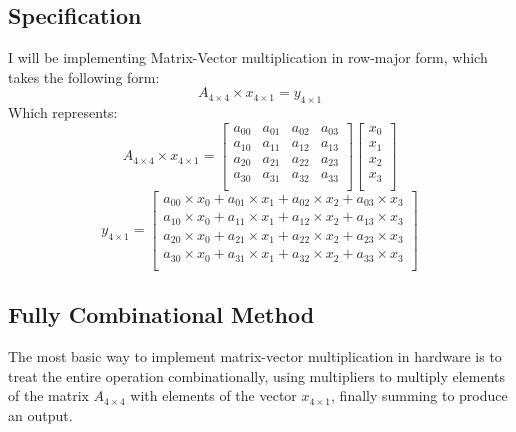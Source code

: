 \documentclass{article}
\begin{document}
\subsection{Specification}
I will be implementing Matrix-Vector multiplication in row-major form, which takes the following form:
\begin{equation}
    A_{4\times4} \times{} x_{4\times1} = y_{4\times1}
\end{equation}
Which represents:
\begin{equation}
A_{4\times4} \times{} x_{4\times1} =
    \left[ {\begin{array}{cccc}
    a_{00} & a_{01} & a_{02} & a_{03} \\
    a_{10} & a_{11} & a_{12} & a_{13} \\
    a_{20} & a_{21} & a_{22} & a_{23} \\
    a_{30} & a_{31} & a_{32} & a_{33} \\
  \end{array} } \right] \left[ {\begin{array}{c}
    x_{0} \\
    x_{1} \\
    x_{2} \\
    x_{3} \\
  \end{array} } \right]
  \end{equation}
  \begin{equation}
  y_{4\times1}
  = \left[ {\begin{array}{c}
    a_{00}\times{}x_0 + a_{01}\times{}x_1 + a_{02}\times{}x_2 + a_{03}\times{}x_3 \\
    a_{10}\times{}x_0 + a_{11}\times{}x_1 + a_{12}\times{}x_2 + a_{13}\times{}x_3 \\
    a_{20}\times{}x_0 + a_{21}\times{}x_1 + a_{22}\times{}x_2 + a_{23}\times{}x_3 \\
    a_{30}\times{}x_0 + a_{31}\times{}x_1 + a_{32}\times{}x_2 + a_{33}\times{}x_3 \\
  \end{array} } \right]
\end{equation}
\subsection{Fully Combinational Method}
The most basic way to implement matrix-vector multiplication in hardware is to treat the entire operation combinationally, using multipliers to multiply elements of the matrix $A_{4\times4}$ with elements of the vector $x_{4\times1}$, finally summing to produce an output.
\end{document}
